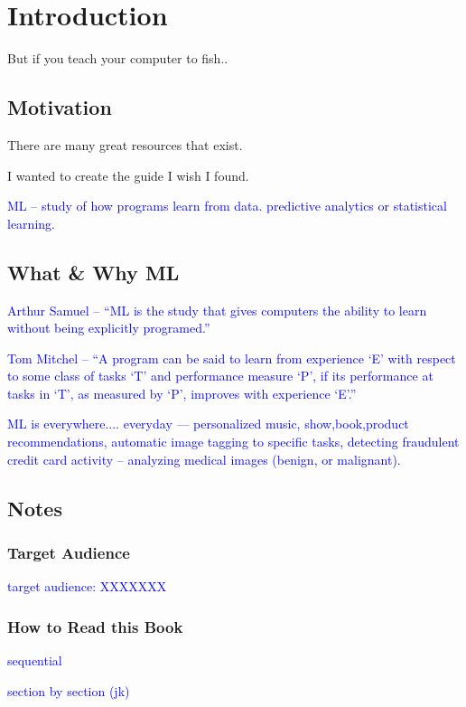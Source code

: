 \chapter{Introduction}

But if you teach your computer to fish..


\section{Motivation}
There are many great resources that exist.

I wanted to create the guide I wish I found.

\textcolor{blue}{ML -- study of how programs learn from data. predictive analytics or statistical learning.}



\section{What \& Why ML}
\textcolor{blue}{Arthur Samuel -- ``ML is the study that gives computers the ability to learn without being explicitly programed.''}

\textcolor{blue}{Tom Mitchel -- ``A program can be said to learn from experience `E' with respect to some class of tasks `T' and performance measure `P', if its performance at tasks in `T', as measured by `P', improves with experience `E'.''}

\textcolor{blue}{ML is everywhere.... everyday --- personalized music, show,book,product recommendations, automatic image tagging to specific tasks, detecting fraudulent credit card activity -- analyzing medical images (benign, or malignant). }


\section{Notes}

\subsection{Target Audience}
\textcolor{blue}{target audience: XXXXXXX}

\subsection{How to Read this Book}
\textcolor{blue}{sequential}

\textcolor{blue}{section by section (jk)}


